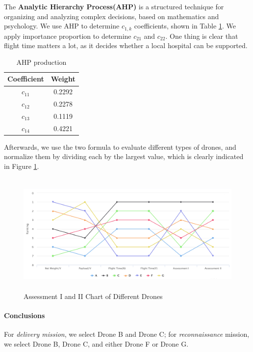 \documentclass{mcmthesis}
\begin{document}
The \textbf{Analytic Hierarchy Process(AHP)} is a structured technique for organizing and analyzing complex decisions, based on mathematics and psychology. We use AHP to determine $c_{1,k}$ coefficients, shown in Table \ref{Tab:AHP}. We apply importance proportion to determine $c_{21}$ and ${c_{22}}$. One thing is clear that flight time matters a lot, as it decides whether a local hospital can be supported.

\begin{table}[h]
    \centering
    \caption{AHP production}
    \label{Tab:AHP}
    \begin{tabular}{c c}
\hline
    	Coefficient & Weight\\
\hline
	$c_{11}$ & 0.2292\\
	$c_{12}$ & 0.2278\\
	$c_{13}$ & 0.1119\\
	$c_{14}$ & 0.4221\\
\hline
    \end{tabular}
\end{table}

Afterwards, we use the two formula to evaluate different types of drones, and normalize them by dividing each by the largest value, which is clearly indicated in Figure \ref{Fig:asse}.


\begin{figure}[htbp]
    \centering
    \includegraphics[width=14cm,height=6cm]{figures/radarassessment.png}
    \caption{Assessment I and II Chart of Different Drones}
    \label{Fig:asse}
\end{figure}

\paragraph{Conclusions}For \emph{delivery mission}, we select Drone B and Drone C; for \emph{reconnaissance} mission, we select Drone B, Drone C, and either Drone F or Drone G.
\end{document}
